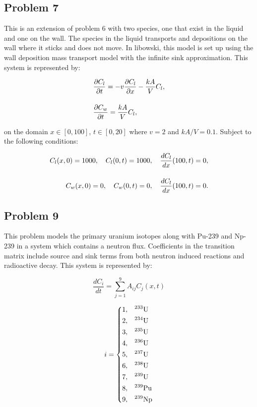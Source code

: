 \subsection{Problem 7}
This is an extension of problem 6 with two species, one that exist in the liquid and one on the wall. The species in the liquid transports and depositions on the wall where it sticks and does not move. In libowski, this model is set up using the wall deposition mass transport model with the infinite sink approximation. This system is represented by:

\begin{equation}
\setlength{\jot}{15pt}
\begin{split}
    &\frac{\partial C_{l}}{\partial t} = -v\frac{\partial C_{l}}{\partial x} - \frac{kA}{V} C_{l}, \\
    &\frac{\partial C_{w}}{\partial t} = \frac{kA}{V} C_{l},
\end{split}
\end{equation}

\noindent on the domain $x \in [0,100]$, $t \in [0, 20]$ where $v = 2$ and $kA/V = 0.1$. Subject to the following conditions:

\begin{equation}
\setlength{\jot}{15pt}
\begin{split}
    C_{l}(x, 0) = 1000, \quad C_{l}(0,t) = 1000, \quad \frac{dC_{l}}{dx}(100, t) = 0, \\
    C_{w}(x, 0) = 0, \quad C_{w}(0,t) = 0, \quad \frac{dC_{l}}{dx}(100, t) = 0. \\
\end{split}
\end{equation}

\subsection{Problem 9}
This problem models the primary uranium isotopes along with Pu-239 and Np-239 in a system which contains a neutron flux. Coefficients in the transition matrix include source and sink terms from both neutron induced reactions and radioactive decay. This system is represented by:


\begin{equation}
\frac{d C_i}{dt} = \sum^9_{j = 1} A_{ij} C_j (x, t)
\end{equation}

\begin{equation}
i = \begin{dcases}
  1 , & \text{$^{233}$U}  \\
  2 , & \text{$^{234}$U}  \\
  3 , & \text{$^{235}$U}  \\
  4 , & \text{$^{236}$U}  \\
  5 , & \text{$^{237}$U}  \\
  6 , & \text{$^{238}$U}  \\
  7 , & \text{$^{239}$U}  \\
  8 , & \text{$^{239}$Pu} \\
  9 , & \text{$^{239}$Np} \\
\end{dcases}
\end{equation}

